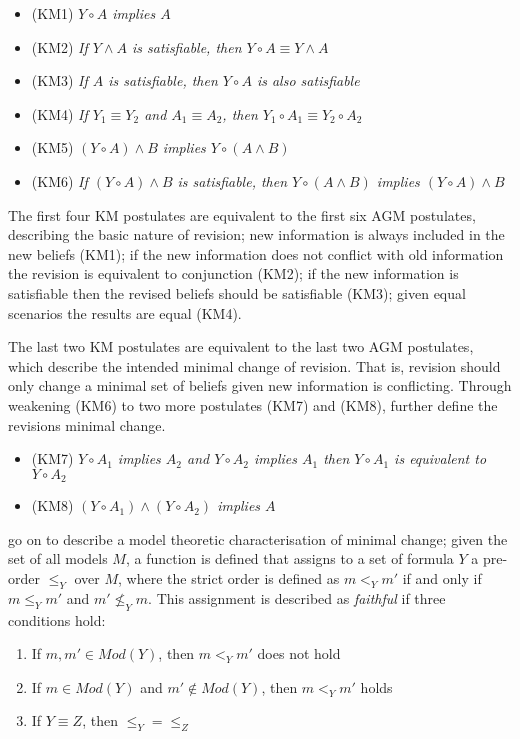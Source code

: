 \begin{itemize}
  \item (KM1) \textit{ $Y \circ A$  implies $A$}
  \item (KM2) \textit{ If $Y \wedge A$  is satisfiable, then $Y \circ A \equiv Y \wedge A$}
  \item (KM3) \textit{ If $A$ is satisfiable, then $Y \circ A$  is also satisfiable}
  \item (KM4) \textit{ If $Y_1 \equiv Y_2$ and $A_1 \equiv A_2$, then $Y_1 \circ A_1 \equiv Y_2 \circ A_2$}
  \item (KM5) \textit{ $(Y \circ A) \wedge B$  implies $Y \circ (A \wedge B)$}
  \item (KM6) \textit{ If $(Y \circ A) \wedge B$ is satisfiable, then $Y \circ (A \wedge B)$ implies $(Y \circ A) \wedge B$}
\end{itemize} 

The first four KM postulates are equivalent to the first six AGM postulates, describing the basic nature of revision;
new information is always included in the new beliefs (KM1); if the new information does not conflict with old information the revision is equivalent to conjunction (KM2);
if the new information is satisfiable then the revised beliefs should be satisfiable (KM3); given equal scenarios the results are equal (KM4).

The last two KM postulates are equivalent to the last two AGM postulates, which describe the intended minimal change of revision.
That is, revision should only change a minimal set of beliefs given new information is conflicting.
Through weakening (KM6) to two more postulates (KM7) and (KM8), \citep{katsuno1991propositional} further define the revisions minimal change.

\begin{itemize}
  \item (KM7) \textit{ $Y \circ A_1$  implies $A_2$ and $Y \circ A_2$ implies $A_1$ then $Y \circ A_1$ is equivalent to $Y \circ A_2$}
  \item (KM8) \textit{ $(Y \circ A_1) \wedge (Y \circ A_2)$ implies $A$}
\end{itemize}

\citep{katsuno1991propositional} go on to describe a model theoretic characterisation of minimal change; 
given the set of all models $M$, a function is defined that assigns to a set of formula $Y$ a pre-order $\leq_{Y}$ over $M$,
where the strict order is defined as $m <_Y m'$ if and only if $m \leq_Y m'$ and $m' \not \leq_Y m$. 
This assignment is described as \textit{faithful} if three conditions hold:
\begin{enumerate}
  \item If $m,m' \in Mod(Y)$, then $m <_Y m'$ does not hold
  \item If $m \in Mod(Y)$ and $m' \not\in Mod(Y)$, then $m <_Y m'$ holds
  \item If $Y \equiv Z$, then $\leq_Y = \leq_Z$  
\end{enumerate}

